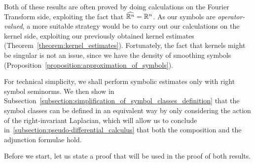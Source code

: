 Both of these results are often proved by doing calculations on the Fourier Transform side,
exploiting the fact that ${\widehat{\mathbb{R}^n}} = \mathbb{R}^n$.
As our symbols are \emph{operator-valued},
a more suitable strategy would be to carry out our calculations on the kernel side,
exploiting our previously obtained kernel estimates (Theorem~\ref{theorem:kernel_estimates}).
Fortunately,
the fact that kernels might be singular is not an issue,
since we have the density of smoothing symbols (Proposition~\ref{proposition:approximation_of_symbols}).

For technical simplicity,
we shall perform symbolic estimates only with right symbol seminorms.
We then show in Subsection~\ref{subsection:simplification_of_symbol_classes_definition}
that the symbol classes can be defined in an equivalent way by only considering the action of the right-invariant Laplacian,
which will allow us to conclude in~\ref{subsection:pseudo-differential_calculus} that both the composition and the adjunction formulae hold.

Before we start,
let us state a proof that will be used in the proof of both results.

